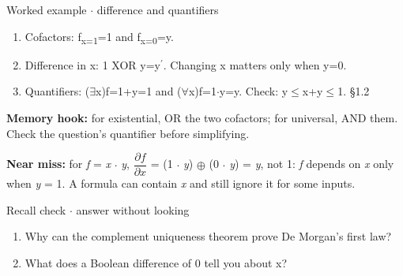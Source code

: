 \documentclass[11pt]{article}
\begin{document}
\begin{keepsection}
\begin{keepsection}
\begin{workedbox}{Worked example \ensuremath{\cdot} difference and quantifiers}
\begin{enumerate}
\item Cofactors: f\textsubscript{x=1}=1 and f\textsubscript{x=0}=y.
\item Difference in x: 1 XOR y=y\ensuremath{{}^{\prime}}. Changing x matters only when y=0.
\item Quantifiers: (\ensuremath{\exists}x)f=1+y=1 and (\ensuremath{\forall}x)f=1\ensuremath{\cdot}y=y. Check: y\ensuremath{\leq}x+y\ensuremath{\leq}1. \hfill{\small\color{FAUblue}§1.2}
\end{enumerate}
\end{workedbox}

\begin{notebox}\textbf{Memory hook:} for existential, OR the two cofactors; for universal, AND them. Check the question’s quantifier before simplifying.\end{notebox}

\begin{notebox}\textbf{Near miss:} for \textit{f} = \textit{x} \ensuremath{\cdot} \textit{y}, {\small\ensuremath{\dfrac{∂{f}}{∂{x}}}} = (1 \ensuremath{\cdot} \textit{y}) \ensuremath{\oplus} (0 \ensuremath{\cdot} \textit{y}) = \textit{y}, not 1: \textit{f} depends on \textit{x} only when \textit{y} = 1. A formula can contain \textit{x} and still ignore it for some inputs.\end{notebox}

\begin{recallbox}{Recall check \ensuremath{\cdot} answer without looking}
\begin{enumerate}
\item Why can the complement uniqueness theorem prove De Morgan’s first law?
\item What does a Boolean difference of 0 tell you about x?
\end{enumerate}

\end{recallbox}
\end{keepsection}
\end{keepsection}
\end{document}

